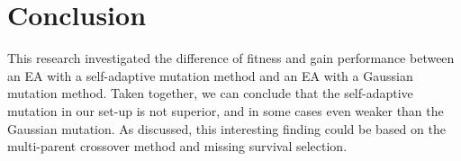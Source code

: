 \section{Conclusion}
This research investigated the difference of fitness and gain performance between an EA with a self-adaptive mutation method and an EA with a Gaussian mutation method. Taken together, we can conclude that the self-adaptive mutation in our set-up is not superior, and in some cases even weaker than the Gaussian mutation. As discussed, this interesting finding could be based on the multi-parent crossover method and missing survival selection.\par

